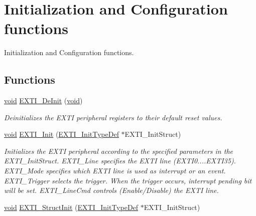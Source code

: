 \hypertarget{group___e_x_t_i___group1}{\section{Initialization and Configuration functions}
\label{group___e_x_t_i___group1}
}


Initialization and Configuration functions.  


\subsection*{Functions}
\begin{DoxyCompactItemize}
\item 
\hyperlink{group___n_a_m_e_ga18028b8badbf1ea7e704ccac3c488e82}{void} \hyperlink{group___e_x_t_i___group1_ga07072e339cb9ecb9cd9d4b94afc9f317}{E\-X\-T\-I\-\_\-\-De\-Init} (\hyperlink{group___n_a_m_e_ga18028b8badbf1ea7e704ccac3c488e82}{void})
\begin{DoxyCompactList}\small\item\em Deinitializes the E\-X\-T\-I peripheral registers to their default reset values. \end{DoxyCompactList}\item 
\hyperlink{group___n_a_m_e_ga18028b8badbf1ea7e704ccac3c488e82}{void} \hyperlink{group___e_x_t_i___group1_ga8c9ce6352a3a2dfc8fc9287cb24c6501}{E\-X\-T\-I\-\_\-\-Init} (\hyperlink{struct_e_x_t_i___init_type_def}{E\-X\-T\-I\-\_\-\-Init\-Type\-Def} $\ast$E\-X\-T\-I\-\_\-\-Init\-Struct)
\begin{DoxyCompactList}\small\item\em Initializes the E\-X\-T\-I peripheral according to the specified parameters in the E\-X\-T\-I\-\_\-\-Init\-Struct. E\-X\-T\-I\-\_\-\-Line specifies the E\-X\-T\-I line (E\-X\-T\-I0....E\-X\-T\-I35). E\-X\-T\-I\-\_\-\-Mode specifies which E\-X\-T\-I line is used as interrupt or an event. E\-X\-T\-I\-\_\-\-Trigger selects the trigger. When the trigger occurs, interrupt pending bit will be set. E\-X\-T\-I\-\_\-\-Line\-Cmd controls (Enable/\-Disable) the E\-X\-T\-I line. \end{DoxyCompactList}\item 
\hyperlink{group___n_a_m_e_ga18028b8badbf1ea7e704ccac3c488e82}{void} \hyperlink{group___e_x_t_i___group1_ga86b9e662d18a2f829999cfb26aa7ca20}{E\-X\-T\-I\-\_\-\-Struct\-Init} (\hyperlink{struct_e_x_t_i___init_type_def}{E\-X\-T\-I\-\_\-\-Init\-Type\-Def} $\ast$E\-X\-T\-I\-\_\-\-Init\-Struct)

\end{DoxyCompactItemize}
